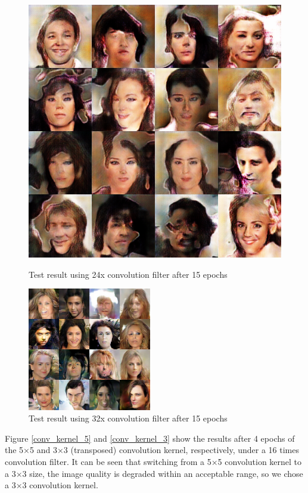 \begin{figure}
\begin{minipage}[t]{0.48\linewidth}
        \includegraphics[width=\textwidth]{figures/result_conv_filter_24.png}
        \caption{Test result using 24x convolution filter after 15 epochs}
        \label{conv_filter_24}
    \end{minipage}
    \begin{minipage}[t]{\linewidth}
        \centering
        \includegraphics[width=0.48\textwidth]{figures/result_conv_filter_32.png}
        \caption{Test result using 32x convolution filter after 15 epochs}
        \label{conv_filter_32}
    \end{minipage}
\end{figure}

Figure \ref{conv_kernel_5} and \ref{conv_kernel_3} show the results after 4 epochs of the 5×5 and 3×3 (transposed) convolution kernel,
    respectively, under a 16 times convolution filter.
It can be seen that switching from a 5×5 convolution kernel to a 3×3 size,
    the image quality is degraded within an acceptable range, so we chose a 3×3 convolution kernel.

